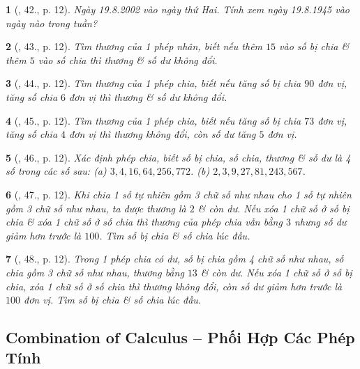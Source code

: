 \documentclass{article}
\newtheorem{baitoan}{}
\begin{document}
\begin{baitoan}[\cite{Binh_Toan_6_tap_1}, 42., p. 12]
	Ngày 19.8.2002 vào ngày thứ Hai. Tính xem ngày 19.8.1945 vào ngày nào trong tuần?
\end{baitoan}

\begin{baitoan}[\cite{Binh_Toan_6_tap_1}, 43., p. 12]
	Tìm thương của 1 phép nhân, biết nếu thêm $15$ vào số bị chia \& thêm $5$ vào số chia thì thương \& số dư không đổi.
\end{baitoan}

\begin{baitoan}[\cite{Binh_Toan_6_tap_1}, 44., p. 12]
	Tìm thương của 1 phép chia, biết nếu tăng số bị chia $90$ đơn vị, tăng số chia $6$ đơn vị thì thương \& số dư không đổi.
\end{baitoan}

\begin{baitoan}[\cite{Binh_Toan_6_tap_1}, 45., p. 12]
	Tìm thương của 1 phép chia, biết nếu tăng số bị chia $73$ đơn vị, tăng số chia $4$ đơn vị thì thương không đổi, còn số dư tăng $5$ đơn vị.
\end{baitoan}

\begin{baitoan}[\cite{Binh_Toan_6_tap_1}, 46., p. 12]
	Xác định phép chia, biết số bị chia, số chia, thương \& số dư là 4 số trong các số sau: (a) $3,4,16,64,256,772$. (b) $2,3,9,27,81,243,567$.
\end{baitoan}

\begin{baitoan}[\cite{Binh_Toan_6_tap_1}, 47., p. 12]
	Khi chia 1 số tự nhiên gồm 3 chữ số như nhau cho 1 số tự nhiên gồm 3 chữ số như nhau, ta được thương là $2$ \& còn dư. Nếu xóa 1 chữ số ở số bị chia \& xóa 1 chữ số ở số chia thì thương của phép chia vẫn bằng $3$ nhưng số dư giảm hơn trước là $100$. Tìm số bị chia \& số chia lúc đầu.
\end{baitoan}

\begin{baitoan}[\cite{Binh_Toan_6_tap_1}, 48., p. 12]
	Trong 1 phép chia có dư, số bị chia gồm 4 chữ số như nhau, số chia gồm 3 chữ số như nhau, thương bằng $13$ \& còn dư. Nếu xóa 1 chữ số ở số bị chia, xóa 1 chữ số ở số chia thì thương không đổi, còn số dư giảm hơn trước là $100$ đơn vị. Tìm số bị chia \& số chia lúc đầu.
\end{baitoan}

\subsection{Combination of Calculus -- Phối Hợp Các Phép Tính}
\end{document}
